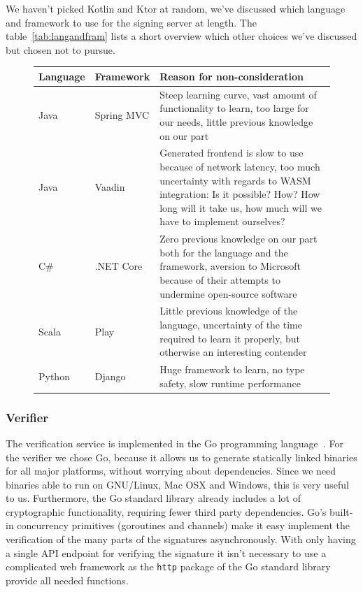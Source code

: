 We haven't picked Kotlin and Ktor at random, we've discussed which language and framework to use for the signing server at length.
The table~\ref{tab:langandfram} lists a short overview which other choices we've discussed but chosen not to pursue.

\begin{figure}
    \begin{center}
        \begin{tabular}{p{1.5cm}|p{2cm}|p{11cm}}
            \textbf{Language} & \textbf{Framework} & \textbf{Reason for non-consideration} \\
            \hline
            Java & Spring MVC & Steep learning curve, vast amount of functionality to learn, too large for our needs, little previous knowledge on our part \\
            \hline
            Java & Vaadin & Generated frontend is slow to use because of network latency, too much uncertainty with regards to \gls{WASM} integration: Is it possible? How? How long will it take us, how much will we have to implement ourselves? \\
            \hline
            C\# & .NET Core & Zero previous knowledge on our part both for the language and the framework, aversion to Microsoft because of their attempts to undermine open-source software~\cite{mseee} \\
            \hline
            Scala & Play & Little previous knowledge of the language, uncertainty of the time required to learn it properly, but otherwise an interesting contender \\
            \hline
            Python & Django & Huge framework to learn, no type safety, slow runtime performance \\
        \end{tabular}
    \end{center}
\end{figure}


\subsubsection{Verifier}
The verification service is implemented in the Go programming language~\cite{golang}.
For the verifier we chose Go,
because it allows us to generate statically linked binaries for all major platforms,
without worrying about dependencies.
Since we need binaries able to run on GNU/Linux, Mac OSX and Windows, this is very useful to us.
Furthermore, the Go standard library already includes a lot of cryptographic functionality,
requiring fewer third party dependencies.
Go's built-in concurrency primitives (goroutines and channels) make it easy implement the verification of the many parts of the signatures asynchronously.
With only having a single \gls{API} endpoint for verifying the signature it isn't necessary to use a complicated web framework as the \texttt{http} package of the Go standard library provide all needed functions.

